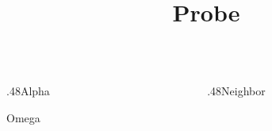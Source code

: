 \documentclass[11pt,aspectratio=169]{beamer}
\title{Probe}
\date{}
\begin{document}
\begin{frame}\begin{columns}[onlytextwidth]\begin{column}{.48\textwidth}\centering Alpha\par Omega\end{column}\begin{column}{.48\textwidth}Neighbor\end{column}\end{columns}\end{frame}
\end{document}
